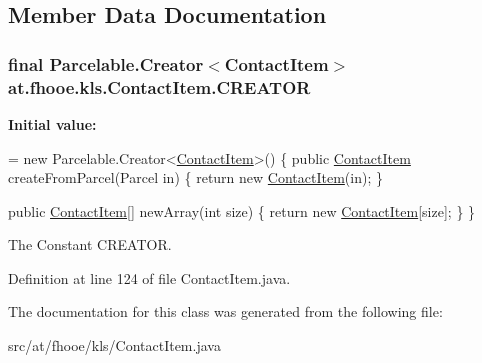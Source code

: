 \subsection{Member Data Documentation}
\hypertarget{classat_1_1fhooe_1_1kls_1_1_contact_item_a065aa2309427edaab34a0cf7e1864eb3}{
\subsubsection[{C\-R\-E\-A\-T\-O\-R}]{\setlength{\rightskip}{0pt plus 5cm}final Parcelable.\-Creator$<${\bf Contact\-Item}$>$ at.\-fhooe.\-kls.\-Contact\-Item.\-C\-R\-E\-A\-T\-O\-R\hspace{0.3cm}{\ttfamily [static]}}}\label{classat_1_1fhooe_1_1kls_1_1_contact_item_a065aa2309427edaab34a0cf7e1864eb3}
{\bfseries Initial value\-:}
\begin{DoxyCode}
= \textcolor{keyword}{new} Parcelable.Creator<\hyperlink{classat_1_1fhooe_1_1kls_1_1_contact_item_a99b2c4911722c8541590f1a4054ae7d2}{ContactItem}>() \{
        \textcolor{keyword}{public} \hyperlink{classat_1_1fhooe_1_1kls_1_1_contact_item_a99b2c4911722c8541590f1a4054ae7d2}{ContactItem} createFromParcel(Parcel in) \{
            \textcolor{keywordflow}{return} \textcolor{keyword}{new} \hyperlink{classat_1_1fhooe_1_1kls_1_1_contact_item_a99b2c4911722c8541590f1a4054ae7d2}{ContactItem}(in);
        \}

        \textcolor{keyword}{public} \hyperlink{classat_1_1fhooe_1_1kls_1_1_contact_item_a99b2c4911722c8541590f1a4054ae7d2}{ContactItem}[] newArray(\textcolor{keywordtype}{int} size) \{
            \textcolor{keywordflow}{return} \textcolor{keyword}{new} \hyperlink{classat_1_1fhooe_1_1kls_1_1_contact_item_a99b2c4911722c8541590f1a4054ae7d2}{ContactItem}[size];
        \}
    \}
\end{DoxyCode}
The Constant C\-R\-E\-A\-T\-O\-R. 

Definition at line 124 of file Contact\-Item.\-java.



The documentation for this class was generated from the following file\-:\begin{DoxyCompactItemize}
\item 
src/at/fhooe/kls/Contact\-Item.\-java\end{DoxyCompactItemize}
